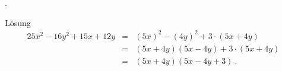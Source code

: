 \begin{MExercises}
\begin{MExercise}
\begin{MExerciseItems}
\item{. \begin{MHint}{Lösung}\begin{eqnarray*}25x^2-16y^2+15x+12y&=&(5x)^2-(4y)^2+3\cdot(5x+4y)\ \\ &=& (5x+4y)(5x-4y)+3\cdot(5x+4y)\ \\ &=& (5x+4y)(5x-4y+3)  \: .\end{eqnarray*}\end{MHint}}
\end{MExerciseItems}
\end{MExercise}
\end{MExercises}


